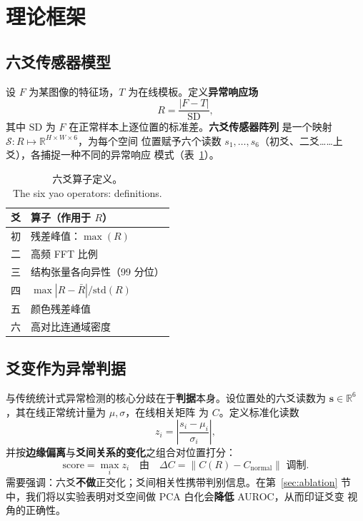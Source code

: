 \documentclass[journal,10pt]{IEEEtran}
\begin{document}
\section{理论框架}
\label{sec:framework}
\subsection{六爻传感器模型}
设 $F$ 为某图像的特征场，$T$ 为在线模板。定义\textbf{异常响应场}
\begin{equation}
R = \frac{|F - T|}{\mathrm{SD}},
\end{equation}
其中 $\mathrm{SD}$ 为 $F$ 在正常样本上逐位置的标准差。\textbf{六爻传感器阵列}
是一个映射 $\mathcal{S}: R \mapsto \mathbb{R}^{H\times W\times 6}$，为每个空间
位置赋予六个读数 $s_1,\dots,s_6$（初爻、二爻……上爻），各捕捉一种不同的异常响应
模式（表~\ref{tab:yao}）。

\begin{table}[t]
\centering
\caption{六爻算子定义。\\ The six yao operators: definitions.}
\label{tab:yao}
\begin{tabular}{cl}
\toprule
爻 & 算子（作用于 $R$） \\
\midrule
初 & 残差峰值：$\max(R)$ \\
二 & 高频 FFT 比例 \\
三 & 结构张量各向异性（99 分位） \\
四 & $\max|R-\bar R| / \mathrm{std}(R)$ \\
五 & 颜色残差峰值 \\
六 & 高对比连通域密度 \\
\bottomrule
\end{tabular}
\end{table}

\subsection{爻变作为异常判据}
\label{sec:yaobian}
与传统统计式异常检测的核心分歧在于\textbf{判据}本身。设位置处的六爻读数为
$\mathbf{s} \in \mathbb{R}^6$，其在线正常统计量为 $\mu, \sigma$，在线相关矩阵
为 $C$。定义标准化读数
\begin{equation}
z_i = \left|\frac{s_i - \mu_i}{\sigma_i}\right|,
\end{equation}
并按\textbf{边缘偏离}与\textbf{爻间关系的变化}之组合对位置打分：
\begin{equation}
\mathrm{score} = \max_i z_i \quad\text{由}\quad
\Delta C = \|C(R) - C_{\text{normal}}\| \text{ 调制}.
\end{equation}
需要强调：六爻\textbf{不做}正交化；爻间相关性携带判别信息。在第~\ref{sec:ablation}
节中，我们将以实验表明对爻空间做 PCA 白化会\textbf{降低} AUROC，从而印证爻变
视角的正确性。
\end{document}
